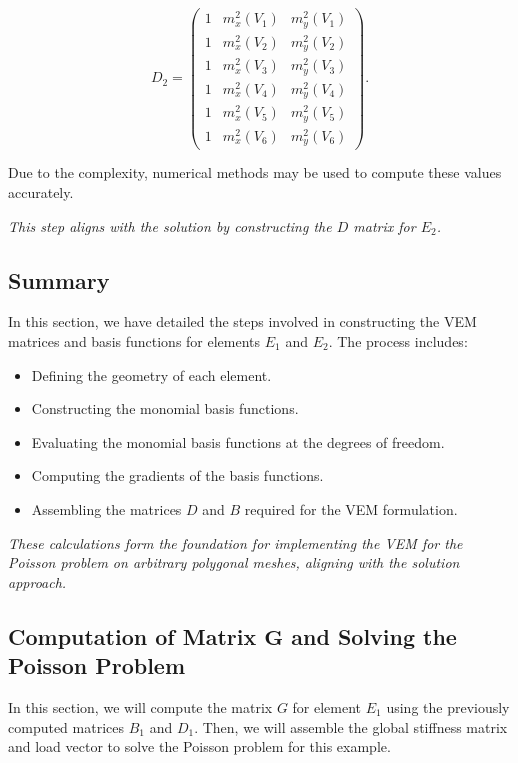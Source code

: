 \documentclass[class=article, crop=false]{standalone}
\begin{document}
\[
D_2 = \begin{pmatrix}
1 & m_x^2(V_1) & m_y^2(V_1) \\
1 & m_x^2(V_2) & m_y^2(V_2) \\
1 & m_x^2(V_3) & m_y^2(V_3) \\
1 & m_x^2(V_4) & m_y^2(V_4) \\
1 & m_x^2(V_5) & m_y^2(V_5) \\
1 & m_x^2(V_6) & m_y^2(V_6)
\end{pmatrix}.
\]

Due to the complexity, numerical methods may be used to compute these values accurately.

\noindent
\textit{This step aligns with the solution by constructing the $D$ matrix for $E_2$.}

\subsection{Summary}

In this section, we have detailed the steps involved in constructing the VEM matrices and basis functions for elements $E_1$ and $E_2$. The process includes:

\begin{itemize}
    \item Defining the geometry of each element.
    \item Constructing the monomial basis functions.
    \item Evaluating the monomial basis functions at the degrees of freedom.
    \item Computing the gradients of the basis functions.
    \item Assembling the matrices $D$ and $B$ required for the VEM formulation.
\end{itemize}

\noindent
\textit{These calculations form the foundation for implementing the VEM for the Poisson problem on arbitrary polygonal meshes, aligning with the solution approach.}

\subsection{Computation of Matrix $\boldsymbol{G}$ and Solving the Poisson Problem}

In this section, we will compute the matrix $G$ for element $E_1$ using the previously computed matrices $B_1$ and $D_1$. Then, we will assemble the global stiffness matrix and load vector to solve the Poisson problem for this example.
\end{document}
